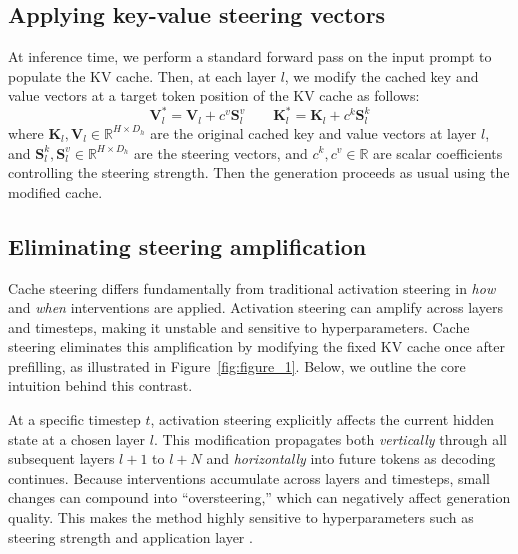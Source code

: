 \documentclass{article} %
\begin{document}
\subsection{Applying key-value steering vectors}

At inference time, we perform a standard forward pass on the input prompt to populate the KV cache. Then, at each layer \( l \), we modify the cached key and value vectors at a target token position of the KV cache as follows:
\[\boldsymbol{V}^*_l = \boldsymbol{V}_l + c^v \boldsymbol{S}^v_l 
\qquad
\boldsymbol{K}^*_l = \boldsymbol{K}_l + c^k \boldsymbol{S}^k_l \]
where \( \boldsymbol{K}_l, \boldsymbol{V}_l \in \mathbb{R}^{H \times D_h} \) are the original cached key and value vectors at layer \( l \), and \( \boldsymbol{S}^k_l, \boldsymbol{S}^v_l \in \mathbb{R}^{H \times D_h} \) are the steering vectors, and \( c^k, c^v \in \mathbb{R} \) are scalar coefficients controlling the steering strength. Then the generation proceeds as usual using the modified cache.

\subsection{Eliminating steering amplification}

Cache steering differs fundamentally from traditional activation steering in \textit{how} and \textit{when} interventions are applied. Activation steering can amplify across layers and timesteps, making it unstable and sensitive to hyperparameters. Cache steering eliminates this amplification by modifying the fixed KV cache once after prefilling, as illustrated in Figure~\ref{fig:figure_1}. Below, we outline the core intuition behind this contrast.


At a specific timestep \(t\), activation steering explicitly affects the current hidden state at a chosen layer \(l\). This modification propagates both \emph{vertically} through all subsequent layers \(l+1\) to \(l+N\) and \emph{horizontally} into future tokens as decoding continues. Because interventions accumulate across layers and timesteps, small changes can compound into “oversteering,” which can negatively affect generation quality. This makes the method highly sensitive to hyperparameters such as steering strength and application layer \citep{turner2308activation, lee2024programming, wang2025adaptive, dong2024contrans, panickssery2023steering, wang2024semantics, stolfo2024improving, zhanguncovering, postmus2024steering}.
\end{document}
